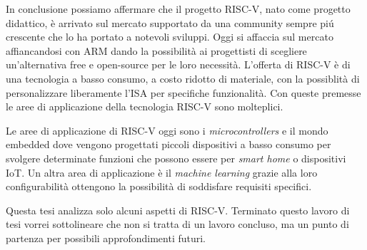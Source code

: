 \documentclass[12pt, a4paper]{report}
\begin{document}
In conclusione possiamo affermare che il progetto RISC-V, nato come progetto didattico, è arrivato sul mercato supportato da una community sempre pi\'u crescente che lo ha portato a notevoli sviluppi. Oggi si affaccia sul mercato affiancandosi con ARM dando la possibilità ai progettisti di scegliere un'alternativa free e open-source per le loro necessità. L'offerta di RISC-V è di una tecnologia a basso consumo, a costo ridotto di materiale, con la possiblità di personalizzare liberamente l'ISA per specifiche funzionalità. Con queste premesse le aree di applicazione della tecnologia RISC-V sono molteplici. 

Le aree di applicazione di RISC-V oggi sono i \textit{microcontrollers} e il mondo embedded dove vengono progettati piccoli dispositivi a basso consumo per svolgere determinate funzioni che possono essere per \textit{smart home} o dispositivi IoT.
Un altra area di applicazione è il \textit{machine learning} grazie alla loro configurabilità ottengono la possibilità di soddisfare requisiti specifici.


Questa tesi analizza solo alcuni aspetti di RISC-V. 
Terminato questo lavoro di tesi vorrei sottolineare che non si tratta di un lavoro concluso, ma un punto di partenza per possibili approfondimenti futuri. 




\printbibliography 
\end{document}
